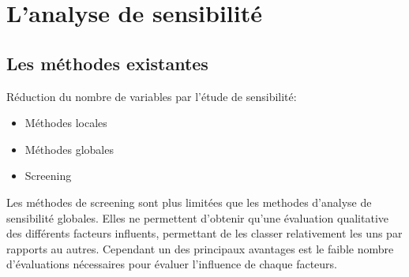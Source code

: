 




\section{L’analyse de sensibilité} %
\label{sec:l_analyse_de_sensibilite}

\subsection{Les méthodes existantes} %
\label{sub:les_méthodes_existantes}
Réduction du nombre de variables par l’étude de sensibilité:
\begin{itemize}
    \item Méthodes locales
    \item Méthodes globales
    \item Screening
\end{itemize}

Les méthodes de screening sont plus limitées que les methodes d’analyse de sensibilité
globales. Elles ne permettent d’obtenir qu’une évaluation qualitative des différents
facteurs influents, permettant de les classer relativement les uns par rapports au autres.
Cependant un des principaux avantages est le faible nombre d’évaluations nécessaires
pour évaluer l’influence de chaque facteurs.

